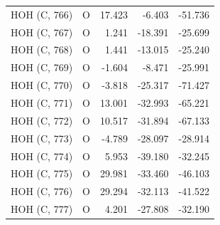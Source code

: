 \begin{longtable}{@{}lcrr@{}}
  \cmidrule(r){1-5}
  HOH (C, 766) & O & 17.423 & -6.403 & -51.736 \\
  \cmidrule(r){1-5}
  HOH (C, 767) & O & 1.241 & -18.391 & -25.699 \\
  \cmidrule(r){1-5}
  HOH (C, 768) & O & 1.441 & -13.015 & -25.240 \\
  \cmidrule(r){1-5}
  HOH (C, 769) & O & -1.604 & -8.471 & -25.991 \\
  \cmidrule(r){1-5}
  HOH (C, 770) & O & -3.818 & -25.317 & -71.427 \\
  \cmidrule(r){1-5}
  HOH (C, 771) & O & 13.001 & -32.993 & -65.221 \\
  \cmidrule(r){1-5}
  HOH (C, 772) & O & 10.517 & -31.894 & -67.133 \\
  \cmidrule(r){1-5}
  HOH (C, 773) & O & -4.789 & -28.097 & -28.914 \\
  \cmidrule(r){1-5}
  HOH (C, 774) & O & 5.953 & -39.180 & -32.245 \\
  \cmidrule(r){1-5}
  HOH (C, 775) & O & 29.981 & -33.460 & -46.103 \\
  \cmidrule(r){1-5}
  HOH (C, 776) & O & 29.294 & -32.113 & -41.522 \\
  \cmidrule(r){1-5}
  HOH (C, 777) & O & 4.201 & -27.808 & -32.190 \\
\end{longtable}
